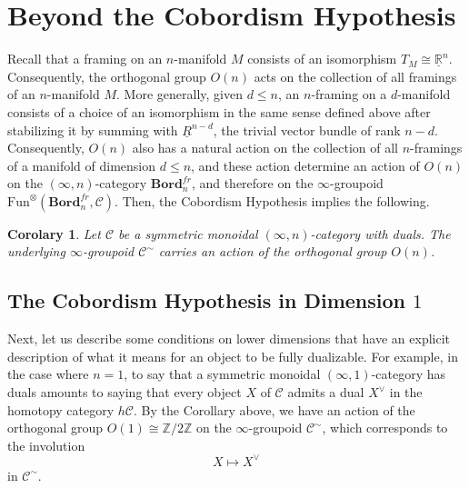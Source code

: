 \documentclass[a4paper,11pt]{article}
\newcommand{\ccal}{\mathcal{C}}
\theoremstyle{plain}
\newtheorem{cor}[thm]{Corolary}
\theoremstyle{definition}
\theoremstyle{remark}
\begin{document}
\section{Beyond the Cobordism Hypothesis}
\label{section_7}

Recall that a framing on an $n$-manifold $M$ consists of an isomorphism $T_M \cong \underline{\mathbb{R}}^n$. Consequently, the orthogonal group $O(n)$ acts on the collection of all framings of an $n$-manifold $M$. More generally, given $d \leq n$, an $n$-framing on a $d$-manifold consists of a choice of an isomorphism in the same sense defined above after stabilizing it by summing with $\underline{R}^{n-d}$, the trivial vector bundle of rank $n-d$. Consequently, $O(n)$ also has a natural action on the collection of all $n$-framings of a manifold of dimension $d \leq n$, and these action determine an action of $O(n)$ on the $(\infty, n)$-category $\textbf{Bord}_n^{fr}$, and therefore on the $\infty$-groupoid $\text{Fun}^{\otimes}(\textbf{Bord}_n^{fr}, \ccal)$. Then, the Cobordism Hypothesis implies the following. 

\begin{cor}
Let $\ccal$ be a symmetric monoidal $(\infty, n)$-category with duals. The underlying $\infty$-groupoid $\ccal^{\sim}$ carries an action of the orthogonal group $O(n)$. 
\end{cor}


\subsection{The Cobordism Hypothesis in Dimension $1$}

Next, let us describe some conditions on lower dimensions that have an explicit description of what it means for an object to be fully dualizable. For example, in the case where $n = 1$, to say that a symmetric monoidal $(\infty, 1)$-category has duals amounts to saying that every object $X$ of $\ccal$ admits a dual $X^{\lor}$ in the homotopy category $h \ccal$. By the Corollary above, we have an action of the orthogonal group $O(1) \cong \mathbb{Z}/2\mathbb{Z}$ on the $\infty$-groupoid $\ccal^{\sim}$, which corresponds to the involution 
$$X \mapsto X^{\lor}$$
in $\ccal^{\sim}$. 
\end{document}
